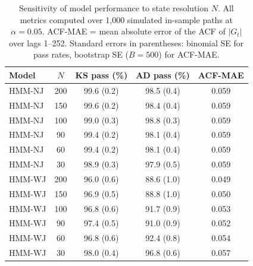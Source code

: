 \clearpage

\begin{table}[htpb]
\centering
\caption{Sensitivity of model performance to state resolution $N$.
    All metrics computed over 1{,}000 simulated in-sample paths at $\alpha=0.05$.
    ACF-MAE = mean absolute error of the ACF of $|G_t|$ over lags 1--252.
    Standard errors in parentheses: binomial SE for pass rates,
    bootstrap SE ($B=500$) for ACF-MAE.}
\label{tab:sensitivity_results}
\begin{tabular}{@{}lcccc@{}}
\toprule
\textbf{Model} & \textbf{$N$} & \textbf{KS pass (\%)} & \textbf{AD pass (\%)} & \textbf{ACF-MAE} \\ \midrule
HMM-NJ & 200 & 99.6 (0.2) & 98.5 (0.4) & 0.059 \\
HMM-NJ & 150 & 99.6 (0.2) & 98.4 (0.4) & 0.059 \\
HMM-NJ & 100 & 99.0 (0.3) & 98.8 (0.3) & 0.059 \\
HMM-NJ &  90 & 99.4 (0.2) & 98.1 (0.4) & 0.059 \\
HMM-NJ &  60 & 99.4 (0.2) & 98.1 (0.4) & 0.059 \\
HMM-NJ &  30 & 98.9 (0.3) & 97.9 (0.5) & 0.059 \\ \midrule
HMM-WJ & 200 & 96.0 (0.6) & 88.6 (1.0) & 0.049 \\
HMM-WJ & 150 & 96.9 (0.5) & 88.8 (1.0) & 0.050 \\
HMM-WJ & 100 & 96.8 (0.6) & 91.7 (0.9) & 0.053 \\
HMM-WJ &  90 & 97.4 (0.5) & 91.0 (0.9) & 0.052 \\
HMM-WJ &  60 & 96.8 (0.6) & 92.4 (0.8) & 0.054 \\
HMM-WJ &  30 & 98.0 (0.4) & 96.8 (0.6) & 0.057 \\ \bottomrule
\end{tabular}
\end{table}

\clearpage

